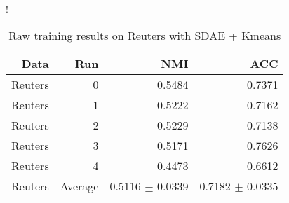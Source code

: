 \begin{table}[ht]
\caption{Raw training results on Reuters with SDAE + Kmeans}\label{tab:idec-raw-Reuters}
\resizebox{\columnwidth}!{
\begin{tabular}{ | r | r | r | r |}
\hline
Data & Run & NMI & ACC  \\ \hline 
Reuters & 0 & 0.5484 & 0.7371 \\ 
Reuters & 1 & 0.5222 & 0.7162 \\ \hdashline 
Reuters & 2 & 0.5229 & 0.7138 \\ 
Reuters & 3 & 0.5171 & 0.7626 \\ \hdashline 
Reuters & 4 & 0.4473 & 0.6612 \\ 
Reuters & Average & 0.5116 $\pm$ 0.0339 & 0.7182 $\pm$ 0.0335 \\ 
\hline
\end{tabular}
}
\end{table}